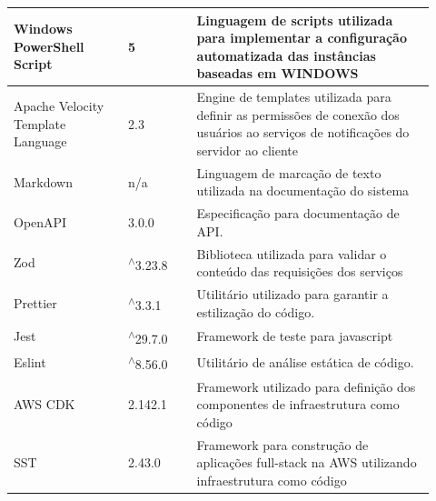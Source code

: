 \begin{longtable}{p{0.25\linewidth} p{0.15\linewidth} p{0.525\linewidth}}
\hline

Windows PowerShell Script \citep{windowspowershelldocs} & 5 & Linguagem de scripts utilizada para implementar a configuração automatizada das instâncias baseadas em WINDOWS \\

\hline

Apache Velocity Template Language \citep{apachevelocitydocs} & 2.3 & Engine de templates utilizada para definir as permissões de conexão dos usuários ao serviços de notificações do servidor ao cliente \\

\hline

Markdown \citep{markdowndocs} & \gls{n/a} & Linguagem de marcação de texto utilizada na documentação do sistema \\

\hline

OpenAPI \citep{openapidocs} & 3.0.0 & Especificação para documentação de API. \\

\hline

Zod \citep{zoddocs} & \textsuperscript{$\wedge$}3.23.8 & Biblioteca utilizada para validar o conteúdo das requisições dos serviços \\

\hline

Prettier \citep{prettierdocs} & \textsuperscript{$\wedge$}3.3.1 & Utilitário utilizado para garantir a estilização do código. \\

\hline

Jest \citep{jestdocs} & \textsuperscript{$\wedge$}29.7.0 & Framework de teste para javascript \\

\hline

Eslint \citep{eslintdocs} & \textsuperscript{$\wedge$}8.56.0 & Utilitário de análise estática de código. \\

\hline

AWS CDK \citep{awscdkdocs} & 2.142.1 & Framework utilizado para definição dos componentes de infraestrutura como código \\

\hline

SST \citep{sstdocs} & 2.43.0 & Framework para construção de aplicações full-stack na AWS utilizando infraestrutura como código \\

\hline


\end{longtable}
